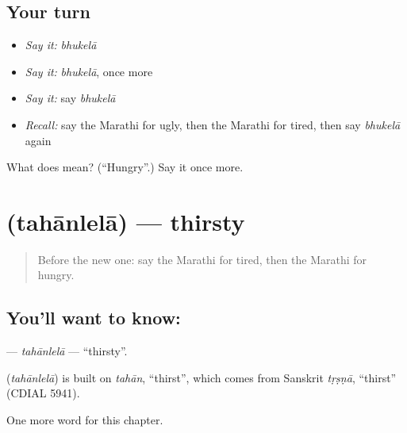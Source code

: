\subsection*{Your turn}
\begin{itemize}
\raggedright
  \item \emph{Say it:} \emph{bhukelā}
  \item \emph{Say it:} \emph{bhukelā}, once more
  \item \emph{Say it:} say \emph{bhukelā}
  \item \emph{Recall:} say the Marathi for ugly, then the Marathi for tired, then say \emph{bhukelā} again
\end{itemize}

\begin{tcolorbox}[breakable,colback=teal!4,colframe=teal!35!black,title={Before you move on}]
What does  mean? (\textquotedblleft{}Hungry\textquotedblright{}.) Say it once more.
\end{tcolorbox}
\section[\texorpdfstring{\mr{तहानलेला} (tahānlelā)}{तहानलेला (tahānlelā)}]{ (tahānlelā) — thirsty}

\label{lesson:MR-C261-tahanlela}



\begin{quote}
Before the new one: say the Marathi for tired, then the Marathi for hungry.
\end{quote}

\subsection*{You'll want to know: }
\textbf{} — \emph{tahānlelā} — \textquotedblleft{}thirsty\textquotedblright{}.

\begin{cousinweb}
\textbf{} (\emph{tahānlelā}) is built on \emph{tahān}, \textquotedblleft{}thirst\textquotedblright{}, which comes from Sanskrit \emph{tṛṣṇā}, \textquotedblleft{}thirst\textquotedblright{} (CDIAL 5941).
\end{cousinweb}

\begin{grammarlens}[title={What you've built}]
One more word for this chapter.
\end{grammarlens}

